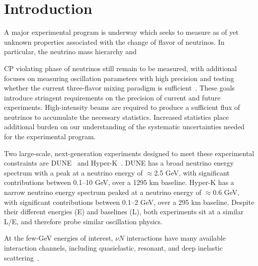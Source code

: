 \documentclass{ar-1col}
\def\asm#1{{\color{blue}#1}}
\def\del#1{}
\def\done#1{{\color{brown}#1}}
\begin{document}
\maketitle

\tableofcontents


\section{Introduction\label{sec:intro}}

A major experimental program is underway which seeks to measure
as of yet unknown properties associated with the change of flavor of neutrinos.
In particular, the neutrino mass hierarchy and%
\begin{marginnote}
\end{marginnote}%
CP violating phase
of neutrinos still remain to be measured, with additional focuses on measuring
oscillation parameters with high precision and testing whether the current
three-flavor mixing paradigm is sufficient~\cite{Esteban:2020cvm, ParticleDataGroup:2020ssz}.
These goals introduce stringent requirements on the precision of current and future experiments.
High-intensity beams are required to produce a sufficient flux of neutrinos to accumulate the necessary statistics.
Increased statistics place additional burden on our understanding of the systematic uncertainties needed for the experimental program.

Two\del{,} \done{large-scale}, next-generation experiments designed to meet these experimental constraints
are
DUNE~\cite{Abi:2020wmh}
and
Hyper-K~\cite{Hyper-Kamiokande:2018ofw}.
DUNE has a broad neutrino energy spectrum with a peak at a neutrino energy of $\approx$2.5 GeV,
with significant contributions between 0.1--10 GeV, over a 1295 km baseline.
Hyper-K has a narrow neutrino energy spectrum peaked at a neutrino energy of $\approx$0.6 GeV, with significant
contributions between 0.1--2 GeV, over a 295 km baseline. Despite their different energies (E) and
baselines (L), both experiments sit at a similar L/E, \del{so }\asm{and therefore }probe similar oscillation physics.%
\begin{marginnote}
\end{marginnote}%
At the few-GeV energies of interest, $\nu N$ interactions have many available interaction channels,
including quasielastic, resonant, and deep inelastic scattering~\cite{zeller12, hayato_review_2014, Mosel:2016cwa, Katori:2016yel, NuSTEC:2017hzk}\asm{.}
\end{document}
